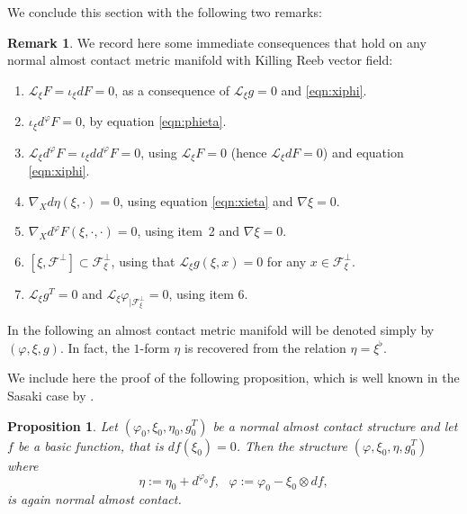 \documentclass{article}
\newtheorem{prop}[thm]{Proposition}
\theoremstyle{definition}
\newtheorem{rmk}[thm]{Remark}
\renewcommand{\phi}{\varphi}
\numberwithin{equation}{section}
\begin{document}
We conclude this section with the following two remarks:
\begin{rmk} \label{rmk:rmk}
We record here some immediate consequences that hold on any normal almost contact metric manifold with Killing Reeb vector field:
\begin{enumerate}
    \item \(\mathcal{L}_\xi F = \iota_\xi dF = 0\), as a consequence of \(\mathcal{L}_\xi g = 0\) and \eqref{eqn:xiphi}.
    \item \(\iota_\xi d^\phi F = 0\), by equation \eqref{eqn:phieta}.
    \item \(\mathcal{L}_\xi d^\phi F = \iota_\xi d d^\phi F = 0\), using \(\mathcal{L}_\xi F = 0\) (hence \(\mathcal{L}_\xi dF = 0\)) and equation \eqref{eqn:xiphi}.
    \item \(\nabla_X d\eta(\xi, \cdot) = 0\), using equation \eqref{eqn:xieta} and \(\nabla \xi = 0\).
    \item \(\nabla_X d^\phi F(\xi, \cdot, \cdot) = 0\), using item~2 and \(\nabla \xi = 0\).
    \item $[\xi, \mathcal{F}^\perp]\subset \mathcal{F}^\perp_\xi$, using that $\mathcal{L}_{\xi} g(\xi,x)=0$ for any $x \in \mathcal{F}^\perp_\xi$.
    \item $\mathcal{L}_\xi g^T=0$ and $\mathcal{L}_\xi \phi_{| \mathcal{F}^\perp_\xi}=0$, using item 6. 
\end{enumerate}
\end{rmk}
In the following an almost contact metric manifold will be denoted simply by $(\phi, \xi,g)$. In fact, the $1$-form $\eta$ is recovered from the relation $\eta=\xi^\flat$. \par
\medskip
We include here the proof of the following proposition, which is well known in the Sasaki case by \cite{BGM,Smoczyk2010}. 
\begin{prop} \label{prop: normality variation}
Let $(\phi_0, \xi_0,\eta_0,g_0^T)$ be a normal almost contact structure and let $f$ be a basic function, that is $df(\xi_0)=0$. Then the structure $(\phi, \xi_0,\eta,g_0^T)$ where
\[
\eta:=\eta_0+d^{\phi_{0}}f, \, \, \, \, \phi:=\phi_0-\xi_0 \otimes df,  
\]
is again normal almost contact. 
\end{prop}
\end{document}
